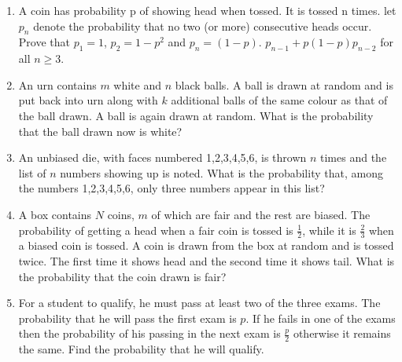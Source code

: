 \documentclass[journal,12pt,onecolumn]{IEEEtran}
\theoremstyle{remark}
\begin{document}
\begin{enumerate}
\hfill{}

\item A coin has probability p of showing head when tossed. It is tossed n times. let $p_{n}$ denote the probability that no two (or more) consecutive heads occur. Prove that $p_{1}=1$, $p_{2}=1-p^2$ and $p_{n}=(1-p)$. $p_{n-1}+p(1-p)p_{n-2}$ for all $n \geq 3$. 

\hfill{}

\item An urn contains $m$ white and $n$ black balls. A ball is drawn at random and is put back into urn along with $k$ additional balls of the same colour as that of the ball drawn. A ball is again drawn at random. What is the probability that the ball drawn now is white?

\hfill{}

\item An unbiased die, with faces numbered 1,2,3,4,5,6, is thrown $n$ times and the list of $n$ numbers showing up is noted. What is the probability that, among the numbers 1,2,3,4,5,6, only three numbers appear in this list?

\hfill{}

\item A box contains $N$ coins, $m$ of which are fair and the rest are biased. The probability of getting a head when a fair coin is tossed is $\frac{1}{2}$, while it is $\frac{2}{3}$ when a biased coin is tossed. A coin is drawn from the box at random and is tossed twice. The first time it shows head and the second time it shows tail. What is the probability that the coin drawn is fair?

\hfill{}

\item For a student to qualify, he must pass at least two of the three exams. The probability that he will pass the first exam is $p$. If he fails in one of the exams then the probability of his passing in the next exam is $\frac{p}{2}$ otherwise it remains the same. Find the probability that he will qualify.

\hfill{}
\end{enumerate}
\end{document}
